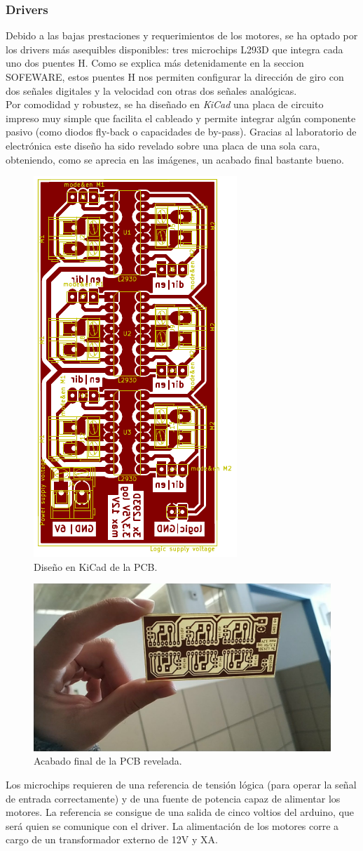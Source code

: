 \subsubsection{Drivers}
Debido a las bajas prestaciones y requerimientos de los motores, se ha optado por los drivers más asequibles disponibles: tres microchips L293D que integra cada uno dos puentes H. Como se explica más detenidamente en la seccion SOFEWARE, estos puentes H nos permiten configurar la dirección de giro con dos señales digitales y la velocidad con otras dos señales analógicas.\\
Por comodidad y robustez, se ha diseñado en \textit{KiCad} una placa de circuito impreso muy simple que facilita el cableado y permite integrar algún componente pasivo (como diodos fly-back o capacidades de by-pass). Gracias al laboratorio de electrónica este diseño ha sido revelado sobre una placa de una sola cara, obteniendo, como se aprecia en las imágenes, un acabado final bastante bueno.\\
 \begin{figure}[h!]
 	\centering
 	\includegraphics[width=.2\textwidth]{images/hw/pcb_kicad}
 	\caption{Diseño en KiCad de la PCB.}
 \end{figure}
  \begin{figure}[h!]
  	\centering
  	\includegraphics[width=.6\textwidth]{images/hw/pcb_img}
  	\caption{Acabado final de la PCB revelada.}
  \end{figure}
 Los microchips requieren de una referencia de tensión lógica (para operar la señal de entrada correctamente) y de una fuente de potencia capaz de alimentar los motores. La referencia se consigue de una salida de cinco voltios del arduino, que será quien se comunique con el driver. La alimentación de los motores corre a cargo de un transformador externo de 12V y XA.
	
